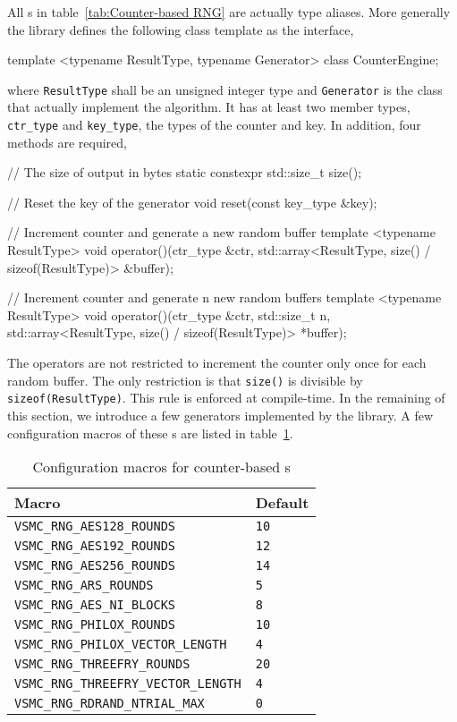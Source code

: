 All \rng{}s in table~\ref{tab:Counter-based RNG} are actually type aliases.
More generally the library defines the following class template as the
interface,
\begin{cppcode}
  template <typename ResultType, typename Generator>
  class CounterEngine;
\end{cppcode}
where \verb|ResultType| shall be an unsigned integer type and \verb|Generator|
is the class that actually implement the algorithm. It has at least two member
types, \verb|ctr_type| and \verb|key_type|, the types of the counter and key.
In addition, four methods are required,
\begin{cppcode}
  // The size of output in bytes
  static constexpr std::size_t size();

  // Reset the key of the generator
  void reset(const key_type &key);

  // Increment counter and generate a new random buffer
  template <typename ResultType>
  void operator()(ctr_type &ctr,
      std::array<ResultType, size() / sizeof(ResultType)> &buffer);

  // Increment counter and generate n new random buffers
  template <typename ResultType>
  void operator()(ctr_type &ctr, std::size_t n,
      std::array<ResultType, size() / sizeof(ResultType)> *buffer);
\end{cppcode}
The operators are not restricted to increment the counter only once for each
random buffer. The only restriction is that \verb|size()| is divisible by
\verb|sizeof(ResultType)|. This rule is enforced at compile-time. In the
remaining of this section, we introduce a few generators implemented by the
library. A few configuration macros of these \rng{}s are listed in
table~\ref{tab:Configuration macros for counter-based RNGs}.

\begin{table}
  \begin{tabularx}{\textwidth}{XX}
    \toprule
    Macro & Default \\
    \midrule
    \verb|VSMC_RNG_AES128_ROUNDS|          & \verb|10| \\
    \verb|VSMC_RNG_AES192_ROUNDS|          & \verb|12| \\
    \verb|VSMC_RNG_AES256_ROUNDS|          & \verb|14| \\
    \verb|VSMC_RNG_ARS_ROUNDS|             & \verb|5|  \\
    \verb|VSMC_RNG_AES_NI_BLOCKS|          & \verb|8|  \\
    \verb|VSMC_RNG_PHILOX_ROUNDS|          & \verb|10| \\
    \verb|VSMC_RNG_PHILOX_VECTOR_LENGTH|   & \verb|4|  \\
    \verb|VSMC_RNG_THREEFRY_ROUNDS|        & \verb|20| \\
    \verb|VSMC_RNG_THREEFRY_VECTOR_LENGTH| & \verb|4|  \\
    \verb|VSMC_RNG_RDRAND_NTRIAL_MAX|      & \verb|0|  \\
    \bottomrule
  \end{tabularx}
  \caption{Configuration macros for counter-based \rng{}s}
  \label{tab:Configuration macros for counter-based RNGs}
\end{table}

